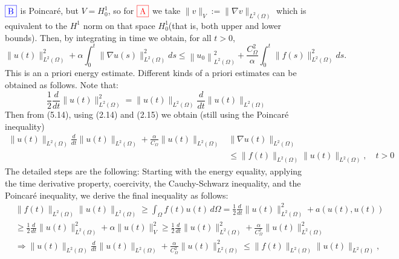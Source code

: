 \documentclass[11pt]{book}
\begin{document}
$\color{blue}{\fbox{B}} $  is Poincaré, but $V=H^1_0$, so for $\color{red}{\fbox{A}}$ we take $\|v\|_V := \|\nabla v\|_{L^2(\Omega)}$ which is equivalent to the $H^1$ norm on that space  $H_0^1$(that is, both upper and lower bounds). 
Then, by integrating in time we obtain, for all $t>0$,
\begin{equation}
\|u(t)\|_{L^{2}(\Omega)}^{2}+\alpha \int_{0}^{t}\|\nabla u(s)\|_{L^{2}(\Omega)}^{2} d s \leq\left\|u_{0}\right\|_{L^{2}(\Omega)}^{2}+\frac{C_{\Omega}^{2}}{\alpha} \int_{0}^{t}\|f(s)\|_{L^{2}(\Omega)}^{2} d s .
\end{equation}
This is an a priori energy estimate. Different kinds of a priori estimates can be obtained as follows. Note that:
$$
\frac{1}{2} \frac{d}{d t}\|u(t)\|_{L^{2}(\Omega)}^{2}=\|u(t)\|_{L^{2}(\Omega)} \frac{d}{d t}\|u(t)\|_{L^{2}(\Omega)}
$$
Then from (5.14), using (2.14) and (2.15) we obtain (still using the Poincaré inequality)
$$
\begin{aligned}
\|u(t)\|_{L^{2}(\Omega)} \frac{d}{d t}\|u(t)\|_{L^{2}(\Omega)}+\frac{\alpha}{C_{\Omega}}\|u(t)\|_{L^{2}(\Omega)} & \|\nabla u(t)\|_{L^{2}(\Omega)} \\
& \leq\|f(t)\|_{L^{2}(\Omega)}\|u(t)\|_{L^{2}(\Omega)}, \quad t>0
\end{aligned}
$$
The detailed steps are the following:
Starting with the energy equality, applying the time derivative property, coercivity, the Cauchy-Schwarz inequality, and the Poincaré inequality, we derive the final inequality as follows:
\[
\begin{aligned}
&\|f(t)\|_{L^2(\Omega)} \|u(t)\|_{L^2(\Omega)} \geq \int_{\Omega} f(t)u(t) \, d\Omega   
= \frac{1}{2} \frac{d}{dt} \|u(t)\|^2_{L^2(\Omega)} + a(u(t), u(t))  \\
&\geq \frac{1}{2} \frac{d}{dt} \|u(t)\|^2_{L^2(\Omega)} + \alpha \|u(t)\|^2_{V} 
\geq \frac{1}{2} \frac{d}{dt} \|u(t)\|^2_{L^2(\Omega)} + \frac{\alpha}{C_{\Omega}^2} \|u(t)\|^2_{L^2(\Omega)}  \\
&\Rightarrow \|u(t)\|_{L^2(\Omega)} \frac{d}{dt}\|u(t)\|_{L^2(\Omega)} + \frac{\alpha}{C_{\Omega}^2} \|u(t)\|_{L^2(\Omega)}^2 \leq \|f(t)\|_{L^2(\Omega)} \|u(t)\|_{L^2(\Omega)},
\end{aligned}
\]
\end{document}
